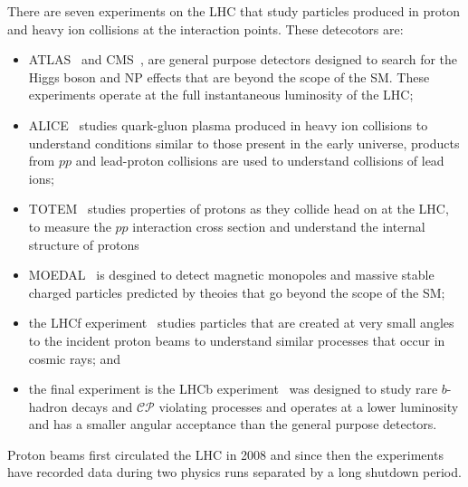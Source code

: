 There are seven experiments on the LHC that study particles produced in proton and heavy ion collisions at the interaction points. These detecotors are: %
\begin{itemize}
\item ATLAS~\cite{Aad:2008zzm} and CMS~\cite{Chatrchyan:2008aa}, are general purpose detectors designed to search for the Higgs boson and NP effects that are beyond the scope of the SM. These experiments operate at the full instantaneous luminosity of the LHC; %
\item ALICE~\cite{Aamodt:2008zz} studies quark-gluon plasma produced in heavy ion collisions to understand conditions similar to those present in the early universe, products from $pp$ and lead-proton collisions are used to understand collisions of lead ions;
\item  TOTEM~\cite{Anelli:2008zza} studies properties of protons as they collide head on at the LHC, to measure the $pp$ interaction cross section and understand the internal structure of protons %
\item MOEDAL~\cite{Pinfold:2009oia} is desgined to detect magnetic monopoles and massive stable charged particles predicted by theoies that go beyond the scope of the SM;
\item the LHCf experiment~\cite{Adriani:2008zz} studies particles that are created at very small angles to the incident proton beams to understand similar processes that occur in cosmic rays; and %
\item the final experiment is the LHCb experiment~\cite{Alves:2008zz} was designed to study rare $b$-hadron decays and $\mathcal{CP}$ violating processes and operates at a lower luminosity and has a smaller angular acceptance than the general purpose detectors. 
\end{itemize}
Proton beams first circulated the LHC in 2008 and since then the experiments have recorded data during two physics runs separated by a long shutdown period.

